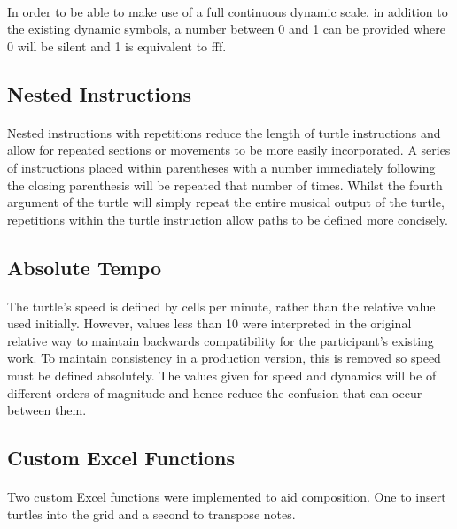 \paragraph{} In order to be able to make use of a full continuous dynamic scale, in addition to the existing dynamic symbols, a number between 0 and 1 can be provided where 0 will be silent and 1 is equivalent to fff.

\subsection{Nested Instructions}

\paragraph{} Nested instructions with repetitions reduce the length of turtle instructions and allow for repeated sections or movements to be more easily incorporated. A series of instructions placed within parentheses with a number immediately following the closing parenthesis will be repeated that number of times. Whilst the fourth argument of the turtle will simply repeat the entire musical output of the turtle, repetitions within the turtle instruction allow paths to be defined more concisely.

\subsection{Absolute Tempo}

\paragraph{} The turtle's speed is defined by cells per minute, rather than the relative value used initially. However, values less than 10 were interpreted in the original relative way to maintain backwards compatibility for the participant's existing work. To maintain consistency in a production version, this is removed so speed must be defined absolutely. The values given for speed and dynamics will be of different orders of magnitude and hence reduce the confusion that can occur between them.

\subsection{Custom Excel Functions}

\paragraph{} Two custom Excel functions were implemented to aid composition. One to insert turtles into the grid and a second to transpose notes.


